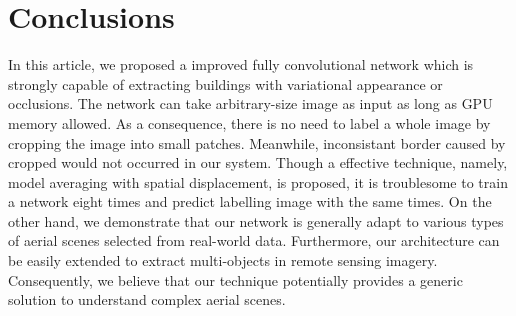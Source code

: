 \documentclass[runningheads]{llncs}
\begin{document}
\section{Conclusions}
   In  this article, we proposed a improved fully convolutional network which is strongly capable of extracting buildings with variational appearance or occlusions. The network can take arbitrary-size image as input as long as GPU memory allowed. As a consequence, there is no need to label a whole image by cropping the image into small patches. Meanwhile, inconsistant border caused by cropped would not occurred in our system. Though a effective technique\cite{Saito2016Multiple}, namely, model averaging with spatial displacement, is proposed, it is troublesome to train a network eight times and predict labelling image with the same times. On the other hand, we demonstrate that our network  is generally adapt to various types of aerial scenes selected from real-world data. Furthermore, our architecture can be easily extended to extract multi-objects in remote sensing imagery. Consequently, we believe that our technique potentially provides a generic solution to understand complex aerial scenes.
	




\end{document}
